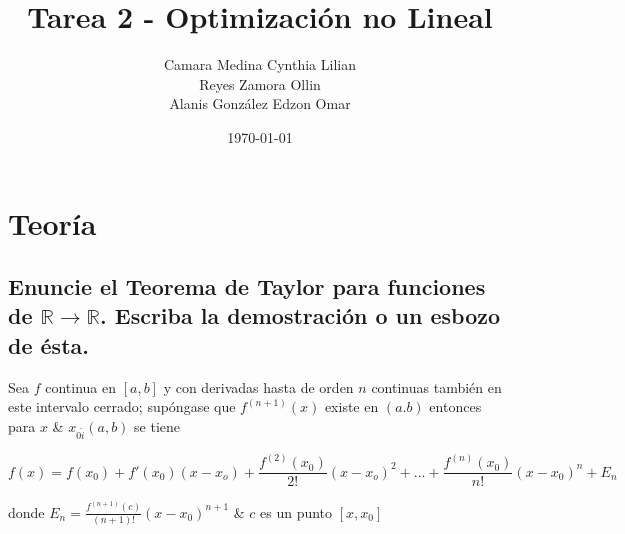 \documentclass[12pt,oneside]{book}
\title{Tarea 2 - Optimización no Lineal}
\author{Camara Medina Cynthia Lilian \\
Reyes Zamora Ollin \\
Alanis González Edzon Omar}
\date{\today}
\begin{document}
\maketitle

\tableofcontents

\chapter{Teoría}

\section[Teorema de Taylor]{Enuncie el Teorema de Taylor para funciones de $\mathbb{R} \rightarrow \mathbb{R}$. Escriba la demostración o un esbozo de ésta.}

Sea $f$ continua en $[a,b]$ y con derivadas hasta de orden $n$ continuas también en este intervalo cerrado; supóngase que $f^{(n+1)}(x)$ existe en $(a.b)$ entonces para $x$ \& $x_{0\hat{i}}(a,b)$ se tiene

\begin{equation*}
    f(x) = f(x_0) + f'(x_0)(x-x_o) + \frac{f^{(2)}(x_0)}{2!}(x-x_o)^2 + ... + \frac{f^{(n)}(x_0)}{n!}(x-x_0)^n + E_n
\end{equation*}

donde $E_n = \frac{f^{(n+1)}(c)}{(n+1)!}(x-x_0)^{n+1}$ \& $c$ es un punto $[x,x_0]$
\end{document}
